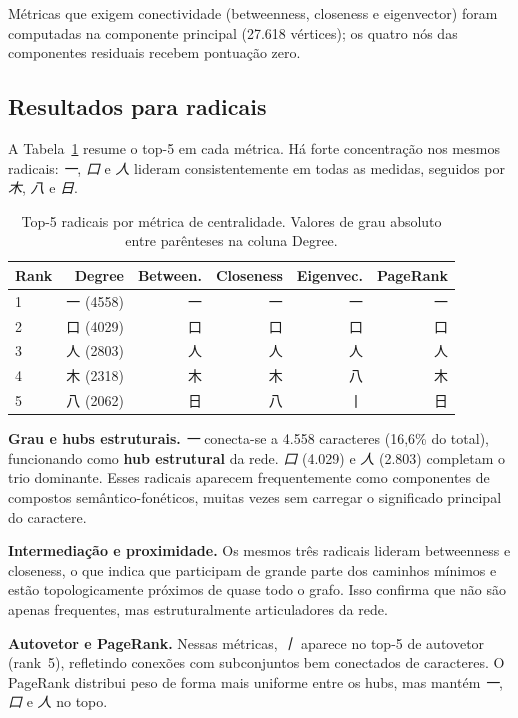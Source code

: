 \documentclass[10pt, a4paper, titlepage]{extarticle}
\begin{document}
Métricas que exigem conectividade (betweenness, closeness e eigenvector) foram computadas na componente principal (27.618 vértices); os quatro nós das componentes residuais recebem pontuação zero.

\subsection{Resultados para radicais}
A Tabela~\ref{tab:centralidade-radicais} resume o top-5 em cada métrica. Há forte concentração nos mesmos radicais: \textit{一},
\textit{口} e \textit{人} lideram consistentemente em todas as medidas, seguidos por \textit{木}, \textit{八} e \textit{日}.

\begin{table}[H]
\centering
\footnotesize
\renewcommand{\arraystretch}{1.1}
\begin{tabular}{lrrrrr}
\toprule
\textbf{Rank} & \textbf{Degree} & \textbf{Between.} &
\textbf{Closeness} & \textbf{Eigenvec.} & \textbf{PageRank} \\
\midrule
1 & 一 (4558)  & 一 & 一 & 一 & 一 \\
2 & 口 (4029)  & 口 & 口 & 口 & 口 \\
3 & 人 (2803)  & 人 & 人 & 人 & 人 \\
4 & 木 (2318)  & 木 & 木 & 八 & 木 \\
5 & 八 (2062)  & 日 & 八 & 丨 & 日 \\
\bottomrule
\end{tabular}
\caption{Top-5 radicais por métrica de centralidade. Valores de grau
absoluto entre parênteses na coluna Degree.}
\label{tab:centralidade-radicais}
\end{table}

\textbf{Grau e hubs estruturais.}
\textit{一} conecta-se a 4.558 caracteres (16,6\% do total),
funcionando como \textbf{hub estrutural} da rede. \textit{口} (4.029) e \textit{人} (2.803) completam o trio dominante. Esses radicais aparecem frequentemente como componentes de compostos semântico-fonéticos, muitas vezes sem carregar o significado principal do caractere.

\textbf{Intermediação e proximidade.}
Os mesmos três radicais lideram betweenness e closeness, o que indica que participam de grande parte dos caminhos mínimos e estão topologicamente próximos de quase todo o grafo. Isso confirma que não são apenas
frequentes, mas estruturalmente articuladores da rede.

\textbf{Autovetor e PageRank.}
Nessas métricas, \textit{丨} aparece no top-5 de autovetor (rank~5), refletindo conexões com subconjuntos bem conectados de caracteres. O PageRank distribui peso de forma mais uniforme entre os hubs, mas mantém \textit{一}, \textit{口} e \textit{人} no topo.
\end{document}

